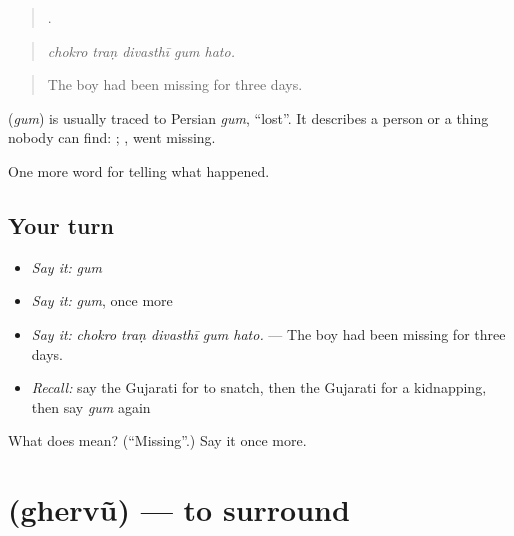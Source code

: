 \begin{quote}
    .
\end{quote}

\begin{quote}
\emph{chokro traṇ divasthī gum hato.}
\end{quote}

\begin{quote}
The boy had been missing for three days.
\end{quote}

\begin{cousinweb}
\textbf{} (\emph{gum}) is usually traced to Persian \emph{gum}, \textquotedblleft{}lost\textquotedblright{}. It describes a person or a thing nobody can find: \textbf{  }; \textbf{ }, went missing.
\end{cousinweb}

\begin{grammarlens}[title={What you've built}]
One more word for telling what happened.
\end{grammarlens}

\subsection*{Your turn}
\begin{itemize}
\raggedright
  \item \emph{Say it:} \emph{gum}
  \item \emph{Say it:} \emph{gum}, once more
  \item \emph{Say it:} \emph{chokro traṇ divasthī gum hato.} — The boy had been missing for three days.
  \item \emph{Recall:} say the Gujarati for to snatch, then the Gujarati for a kidnapping, then say \emph{gum} again
\end{itemize}

\begin{tcolorbox}[breakable,colback=teal!4,colframe=teal!35!black,title={Before you move on}]
What does  mean? (\textquotedblleft{}Missing\textquotedblright{}.) Say it once more.
\end{tcolorbox}
\section[\texorpdfstring{\gu{ઘેરવું} (ghervũ)}{ઘેરવું (ghervũ)}]{ (ghervũ) — to surround}

\label{lesson:GU-C291-ghervu}



